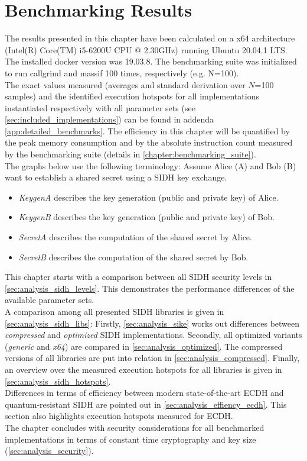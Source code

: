 \chapter{Benchmarking Results}\label{chapter:analysis}

The results presented in this chapter have been calculated on a x64 architecture (Intel(R) Core(TM) i5-6200U CPU @ 2.30GHz) running Ubuntu 20.04.1 LTS. The installed docker version was 19.03.8. The benchmarking suite was initialized to run callgrind and massif 100 times, respectively (e.g. N=100).\\
The exact values measured (averages and standard derivation over $N$=100 samples) and the identified execution hotspots for all implementations instantiated respectively with all parameter sets (see \autoref{sec:included_implementations}) can be found in addenda \ref{app:detailed_benchmarks}. The efficiency in this chapter will be quantified by the peak memory consumption and by the absolute instruction count measured by the benchmarking suite (details in \autoref{chapter:benchmarking_suite}). \\
The graphs below use the following terminology:
Assume Alice (A) and Bob (B) want to establish a shared secret using a SIDH key exchange.
\begin{itemize}
\item \textit{KeygenA} describes the key generation (public and private key) of Alice.
\item \textit{KeygenB} describes the key generation (public and private key) of Bob.
\item \textit{SecretA} describes the computation of the shared secret by Alice.
\item \textit{SecretB} describes the computation of the shared secret by Bob.
\end{itemize}
This chapter starts with a comparison between all SIDH security levels in \autoref{sec:analysis_sidh_levels}. This demonstrates the performance differences of the available parameter sets. \\
A comparison among all presented SIDH libraries is given in \autoref{sec:analysis_sidh_libs}: Firstly, \ref{sec:analysis_sike} works out differences between \textit{compressed} and \textit{optimized} SIDH implementations. Secondly, all optimized variants (\textit{generic} and \textit{x64}) are compared in \ref{sec:analysis_optimized}. The compressed versions of all libraries are put into relation in \ref{sec:analysis_compressed}. Finally, an overview over the measured execution hotspots for all libraries is given in \ref{sec:analysis_sidh_hotspots}.\\
Differences in terms of efficiency between modern state-of-the-art ECDH and quantum-resistant SIDH are pointed out in \autoref{sec:analysis_effiency_ecdh}. This section also highlights execution hotspots measured for ECDH.\\
The chapter concludes with security considerations for all benchmarked implementations in terms of constant time cryptography and key size (\autoref{sec:analysis_security}). 

